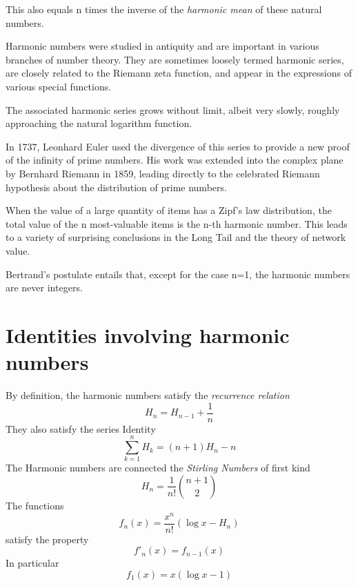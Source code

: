 \documentclass[2pt]{article}
\begin{document}
\par This also equals n times the inverse of the \emph{harmonic mean} of these natural numbers.\\
\par Harmonic numbers were studied in antiquity and are important in various branches of number theory. They are sometimes loosely termed harmonic series, are closely related to the Riemann zeta function, and appear in the expressions of various special functions.\\
\par The associated harmonic series grows without limit, albeit very slowly, roughly approaching the natural logarithm function. 
\par In 1737, Leonhard Euler used the divergence of this series to provide a new proof of the infinity of prime numbers. His work was extended into the complex plane by Bernhard Riemann in 1859, leading directly to the celebrated Riemann hypothesis about the distribution of prime numbers.\\
\par When the value of a large quantity of items has a Zipf's law distribution, the total value of the n most-valuable items is the n-th harmonic number. This leads to a variety of surprising conclusions in the Long Tail and the theory of network value.\\
\par Bertrand's postulate entails that, except for the case n=1, the harmonic numbers are never integers.
\\
\section{Identities involving harmonic numbers}
By definition, the harmonic numbers satisfy the \emph{recurrence relation}
\begin{equation} 
H_{n}=H_{n-1}+\frac{1}{n} \label{recurrence relation}\nonumber
\end{equation}
They also satisfy the series Identity
\begin{equation}
\sum_{k=1}^n H_{k} = (n+1) H_{n} - n \label{Series Identity}\nonumber
\end{equation}
The Harmonic numbers are connected the \emph{Stirling Numbers} of first kind
\begin{equation}
H_{n} = \frac{1}{n!} {n+1 \choose 2} \label{Stirling Identity}\nonumber
\end{equation}
The functions
\begin{equation}
f_{n} (x) = \frac{x^n}{n!} (\log{x}-H_{n})\nonumber
\end{equation}
satisfy the property
\begin{equation}
{f'}_{n} (x) = f_{n-1} (x)\nonumber
\end{equation}
In particular
\begin{equation}
f_{1} (x) = x(\log{x}-1)   \nonumber    			
\end{equation}
\end{document}
